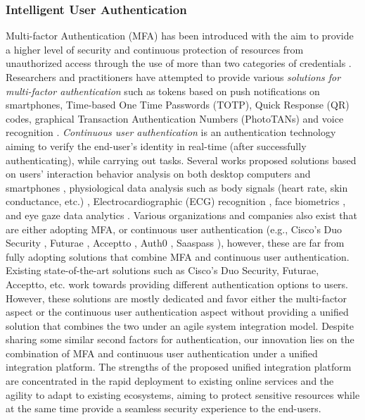 \documentclass[a4paper,11pt]{article}
\begin{document}
\subsubsection{Intelligent User Authentication}
\label{sect:auth}

Multi-factor Authentication (MFA) has been introduced with the aim to provide a higher level of security and continuous protection of resources from unauthorized access through the use of more than two categories of credentials \cite{scheidt2005multiple, bhargav2007privacy}. Researchers and practitioners have attempted to provide various \textit{solutions for multi-factor authentication} such as tokens based on push notifications on smartphones, Time-based One Time Passwords (TOTP), Quick Response (QR) codes, graphical Transaction Authentication Numbers (PhotoTANs) and voice recognition \cite{mare2016study, ometov2018multi, 10.1145/1053291.1053327}. \textit{Continuous user authentication} is an authentication technology aiming to verify the end-user's identity in real-time (after successfully authenticating), while  carrying out tasks. Several works proposed solutions based on users’ interaction behavior analysis on both desktop computers and smartphones \cite{10.1145/2991079.2991097, 10.1145/2702123.2702252, gascon2014continuous}, physiological data analysis such as body signals (heart rate, skin conductance, etc.) \cite{ometov2018multi, rui2018survey}, Electrocardiographic (ECG) recognition \cite{silva2011clinical}, face biometrics \cite{bhattacharyya2009biometric, dabbah2007secure}, and eye gaze data analytics \cite{jain2004introduction, bulling2012increasing}. Various organizations and companies also exist that are either adopting MFA, or continuous user authentication (e.g., Cisco’s Duo Security \cite{duo}, Futurae \cite{Futurae}, Acceptto \cite{Acceptto}, Auth0 \cite{Auth0}, Saaspass \cite{Saaspass}), however, these are far from fully adopting solutions that combine MFA and continuous user authentication. Existing state-of-the-art solutions such as Cisco’s Duo Security, Futurae, Acceptto, etc. work towards providing different authentication options to users. However, these solutions are mostly dedicated and favor either the multi-factor aspect or the continuous user authentication aspect without providing a unified solution that combines the two under an agile system integration model. Despite sharing some similar second factors for authentication, our innovation lies on the combination of MFA and continuous user authentication under a unified integration platform. The strengths of the proposed unified integration platform are concentrated in the rapid deployment to existing online services and the agility to adapt to existing ecosystems, aiming to protect sensitive resources while at the same time provide a seamless security experience to the end-users.
\end{document}
